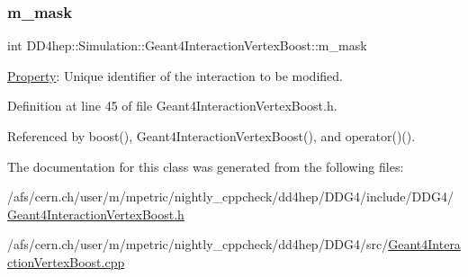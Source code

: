 \hypertarget{class_d_d4hep_1_1_simulation_1_1_geant4_interaction_vertex_boost_a6627def92b1b92c93ad455853c65f3c3}{}\label{class_d_d4hep_1_1_simulation_1_1_geant4_interaction_vertex_boost_a6627def92b1b92c93ad455853c65f3c3} 
\subsubsection{\texorpdfstring{m\+\_\+mask}{m\_mask}}
{\footnotesize\ttfamily int D\+D4hep\+::\+Simulation\+::\+Geant4\+Interaction\+Vertex\+Boost\+::m\+\_\+mask\hspace{0.3cm}{\ttfamily [protected]}}



\hyperlink{class_d_d4hep_1_1_property}{Property}\+: Unique identifier of the interaction to be modified. 



Definition at line 45 of file Geant4\+Interaction\+Vertex\+Boost.\+h.



Referenced by boost(), Geant4\+Interaction\+Vertex\+Boost(), and operator()().



The documentation for this class was generated from the following files\+:\begin{DoxyCompactItemize}
\item 
/afs/cern.\+ch/user/m/mpetric/nightly\+\_\+cppcheck/dd4hep/\+D\+D\+G4/include/\+D\+D\+G4/\hyperlink{_geant4_interaction_vertex_boost_8h}{Geant4\+Interaction\+Vertex\+Boost.\+h}\item 
/afs/cern.\+ch/user/m/mpetric/nightly\+\_\+cppcheck/dd4hep/\+D\+D\+G4/src/\hyperlink{_geant4_interaction_vertex_boost_8cpp}{Geant4\+Interaction\+Vertex\+Boost.\+cpp}\end{DoxyCompactItemize}
